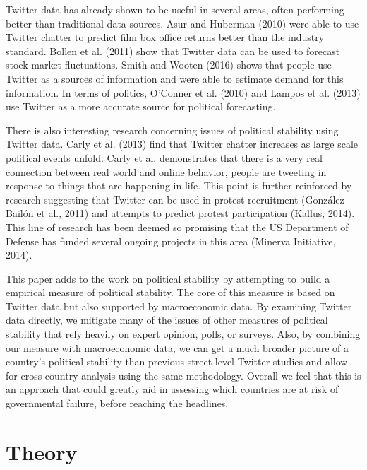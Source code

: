 \documentclass[12pt]{article}
\begin{document}
\begin{spacing}{1.5}
Twitter data has already shown to be useful in several areas, often performing better than traditional data sources. Asur and Huberman (2010) were able to use Twitter chatter to predict film box office returns better than the industry standard. Bollen et al. (2011) show that Twitter data can be used to forecast stock market fluctuations. Smith and Wooten (2016) shows that people use Twitter as a sources of information and were able to estimate demand for this information. In terms of politics, O'Conner et al. (2010) and Lampos et al. (2013) use Twitter as a more accurate source for political forecasting. 

There is also interesting research concerning issues of political stability using Twitter data. Carly et al. (2013) find that Twitter chatter increases as large scale political events unfold. Carly et al. demonstrates that there is a very real connection between real world and online behavior, people are tweeting in response to things that are happening in life. This point is further reinforced by research suggesting that Twitter can be used in protest recruitment (Gonz{\'a}lez-Bail{\'o}n et al., 2011) and attempts to predict protest participation (Kallus, 2014). This line of research has been deemed so promising that the US Department of Defense has funded several ongoing projects in this area (Minerva Initiative, 2014).  

This paper adds to the work on political stability by attempting to build a empirical measure of political stability. The core of this measure is based on Twitter data but also supported by macroeconomic data. By examining Twitter data directly, we mitigate many of the issues of other measures of political stability that rely heavily on expert opinion, polls, or surveys. Also, by combining our measure with macroeconomic data, we can get a much broader picture of a country's political stability than previous street level Twitter studies and allow for cross country analysis using the same methodology. Overall we feel that this is an approach that could greatly aid in assessing which countries are at risk of governmental failure, before reaching the headlines.      

\section*{Theory}



\end{spacing}
\end{document}
